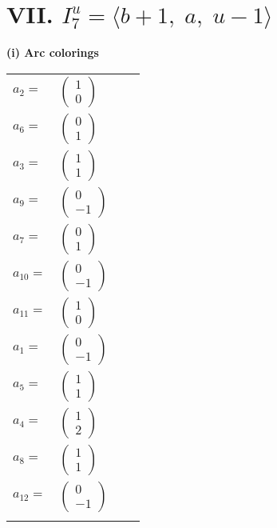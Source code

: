 \documentclass[1p]{elsarticle_modified}
\theoremstyle{definition}
\begin{document}
\centering \section*{VII. $I^u_{7}= \langle b+1,\;a,\;u-1 \rangle$}
\flushleft \textbf{(i) Arc colorings}\\
\begin{tabular}{m{7pt} m{180pt} m{7pt} m{180pt} }
\flushright $a_{2}=$&$\begin{pmatrix}1\\0\end{pmatrix}$ \\
\flushright $a_{6}=$&$\begin{pmatrix}0\\1\end{pmatrix}$ \\
\flushright $a_{3}=$&$\begin{pmatrix}1\\1\end{pmatrix}$ \\
\flushright $a_{9}=$&$\begin{pmatrix}0\\-1\end{pmatrix}$ \\
\flushright $a_{7}=$&$\begin{pmatrix}0\\1\end{pmatrix}$ \\
\flushright $a_{10}=$&$\begin{pmatrix}0\\-1\end{pmatrix}$ \\
\flushright $a_{11}=$&$\begin{pmatrix}1\\0\end{pmatrix}$ \\
\flushright $a_{1}=$&$\begin{pmatrix}0\\-1\end{pmatrix}$ \\
\flushright $a_{5}=$&$\begin{pmatrix}1\\1\end{pmatrix}$ \\
\flushright $a_{4}=$&$\begin{pmatrix}1\\2\end{pmatrix}$ \\
\flushright $a_{8}=$&$\begin{pmatrix}1\\1\end{pmatrix}$ \\
\flushright $a_{12}=$&$\begin{pmatrix}0\\-1\end{pmatrix}$\\&\end{tabular}
\end{document}
